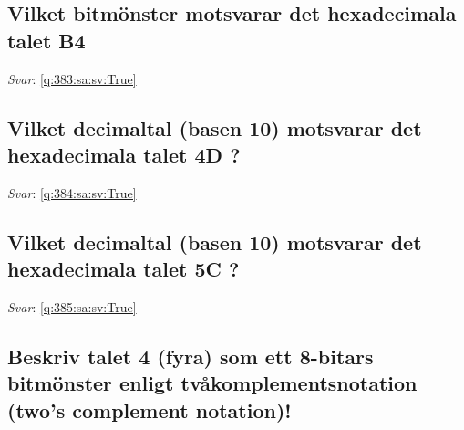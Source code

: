 \documentclass[a4paper,11pt,oneside]{article}
\begin{document}
\begin{sloppypar}
\subsection{Vilket bitm\"onster motsvarar det hexadecimala talet B4}

\label{q:383:sa:sv:False}

\vspace{2cm}

\noindent\makebox[\textwidth]{\hrulefill}

\vspace{1cm}

\textit{Svar}: \autoref{q:383:sa:sv:True}



\subsection{Vilket decimaltal (basen 10) motsvarar det hexadecimala talet 4D ?}

\label{q:384:sa:sv:False}

\vspace{2cm}

\noindent\makebox[\textwidth]{\hrulefill}

\vspace{1cm}

\textit{Svar}: \autoref{q:384:sa:sv:True}



\subsection{Vilket decimaltal (basen 10) motsvarar det hexadecimala talet 5C ?}

\label{q:385:sa:sv:False}

\vspace{2cm}

\noindent\makebox[\textwidth]{\hrulefill}

\vspace{1cm}

\textit{Svar}: \autoref{q:385:sa:sv:True}



\subsection{Beskriv talet 4 (fyra) som ett 8-bitars bitm\"onster enligt tv\r{a}komplementsnotation (two{\textquoteright}s complement notation)!}

\label{q:386:sa:sv:False}


\end{sloppypar}
\end{document}
